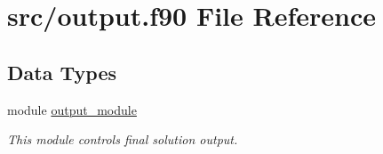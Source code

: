 \hypertarget{output_8f90}{\section{src/output.f90 File Reference}
\label{output_8f90}
}
\subsection*{Data Types}
\begin{DoxyCompactItemize}
\item 
module \hyperlink{classoutput__module}{output\-\_\-module}
\begin{DoxyCompactList}\small\item\em This module controls final solution output. \end{DoxyCompactList}\end{DoxyCompactItemize}
